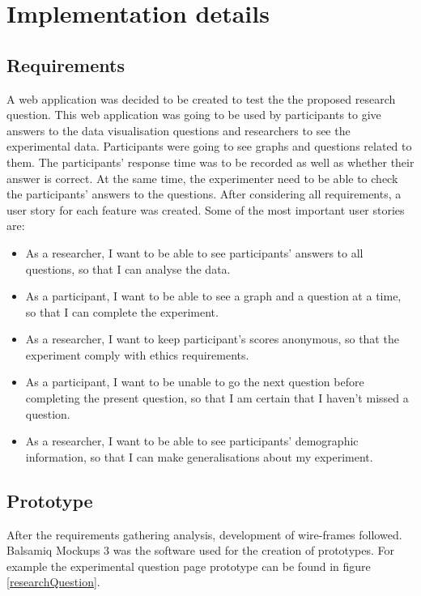 \documentclass{l4proj}
\begin{document}
\chapter{Implementation details}

\section{Requirements}
\label{Requirements}

A web application was decided to be created to test the the proposed research question. This web application was going to be used by participants to give answers to the data visualisation questions and researchers to see the experimental data. Participants were going to see graphs and questions related to them. The participants' response time was to be recorded as well as whether their answer is correct. At the same time, the experimenter need to be able to check the participants' answers to the questions. After considering all requirements, a user story for each feature was created. Some of the most important user stories are:

\begin{itemize}
   \item As a researcher, I want to be able to see participants' answers to all questions, so that I can analyse the data.
   \item As a participant, I want to be able to see a graph and a question at a time, so that I can complete the experiment.
   \item As a researcher, I want to keep participant's scores anonymous, so that the experiment comply with ethics requirements.
   \item As a participant, I want to be unable to go the next question before completing the present question, so that I am certain that I haven't missed a question.
   \item As a researcher, I want to be able to see participants' demographic information, so that I can make generalisations about my experiment.
\end{itemize}

\section{Prototype}
After the requirements gathering analysis, development of wire-frames followed. Balsamiq Mockups 3 was the software used for the creation of prototypes. For example the experimental question page prototype can be found in figure \ref{researchQuestion}.
\end{document}
